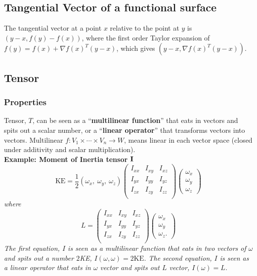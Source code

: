 \subsection{Tangential Vector of a functional surface}
The tangential vector at a point $x$ relative to the point at $y$ is $(y-x,f(y)-f(x))$, where the
first order Taylor expansion of $f(y) = f(x) + \nabla f(x)^T(y-x)$, which gives $(y-x,\nabla f(x)^T(y-x))$.  

\subsection{Tensor}
\subsubsection{Properties}
Tensor, $T$, can be seen as a ``{\bf multilinear function}'' that eats in vectors and spits out a
scalar number, or a ``{\bf linear operator}'' that transforms vectors into vectors. 
Multilinear $f : V_1 \times \cdots \times V_n \rightarrow W$, means linear in each vector space
(closed under additivity and scalar multiplication). \\
{\bf Example: Moment of Inertia tensor ${\bf I}$} \\
\emph{
\begin{equation}
   \text{KE} = \frac{1}{2} (\omega_x, \ \omega_y, \ \omega_z) 
   \begin{pmatrix}
      I_{xx} & I_{xy} & I_{xz} \\
      I_{yx} & I_{yy} & I_{yz} \\
      I_{zx} & I_{zy} & I_{zz} \\
   \end{pmatrix} 
   \begin{pmatrix}
      \omega_x \\ \omega_y \\ \omega_z
   \end{pmatrix}
\end{equation}
where
\begin{equation}
   L =   
   \begin{pmatrix}
      I_{xx} & I_{xy} & I_{xz} \\
      I_{yx} & I_{yy} & I_{yz} \\
      I_{zx} & I_{zy} & I_{zz} \\
   \end{pmatrix} 
   \begin{pmatrix}
      \omega_x \\ \omega_y \\ \omega_z.
   \end{pmatrix}
\end{equation}
The first equation, $I$ is seen as a multilinear function that eats in two vectors of $\omega$ and
spits out a number $2$KE, $I(\omega,\omega) = 2\text{KE}$.
The second equation, $I$ is seen as a linear operator that eats in $\omega$ vector and spits out $L$
vector, $I(\omega) = L$. \\
}

